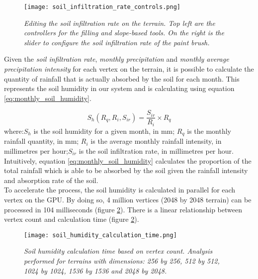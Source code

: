 \begin{figure}
\center
	\texttt{[image: soil\_infiltration\_rate\_controls.png]}
	\caption{ \textit{Editing the soil infiltration rate on the terrain. Top left are the controllers for the \textit{filling} and \textit{slope-based} tools. On the right is the slider to configure the soil infiltration rate of the \textit{paint brush}.} }
	\label{fig:soil_infiltration_controls}
\end{figure}

Given the \textit{soil infiltration rate}, \textit{monthly precipitation} and \textit{monthly average precipitation intensity} for each vertex on the terrain, it is possible to calculate the quantity of rainfall that is actually absorbed by the soil for each month. This represents the soil humidity in our system and is calculating using equation \ref{eq:monthly_soil_humidity}. 

\begin{equation} \label{eq:monthly_soil_humidity}
	S_{h}(R_{q},R_{i},S_{ir}) = 
	\frac{S_{ir}}{R_{i}} \times R_{q}
\end{equation}
where:\textit{$S_{h}$} is the soil humidity for a given month, in mm; \textit{$R_{q}$} is the monthly rainfall quantity, in mm; \textit{$R_{i}$} is the average monthly rainfall intensity, in millimetres per hour;\textit{$S_{ir}$} is the soil infiltration rate, in millimetres per hour.\\

Intuitively, equation \ref{eq:monthly_soil_humidity} calculates the proportion of the total rainfall which is able to be absorbed by the soil given the rainfall intensity and absorption rate of the soil.\\

To accelerate the process, the soil humidity is calculated in parallel for each vertex on the GPU. By doing so, 4 million vertices (2048 by 2048 terrain) can be processed in 104 milliseconds (figure \ref{fig:soil_humidity_calculation_time}). There is a linear relationship between vertex count and calculation time (figure \ref{fig:soil_humidity_calculation_time}).

\begin{figure}
\center
	\texttt{[image: soil\_humidity\_calculation\_time.png]}
	\caption{ \textit{Soil humidity calculation time based on vertex count. Analysis performed for terrains with dimensions: 256 by 256, 512 by 512, 1024 by 1024, 1536 by 1536 and 2048 by 2048.} }
	\label{fig:soil_humidity_calculation_time}
\end{figure}


